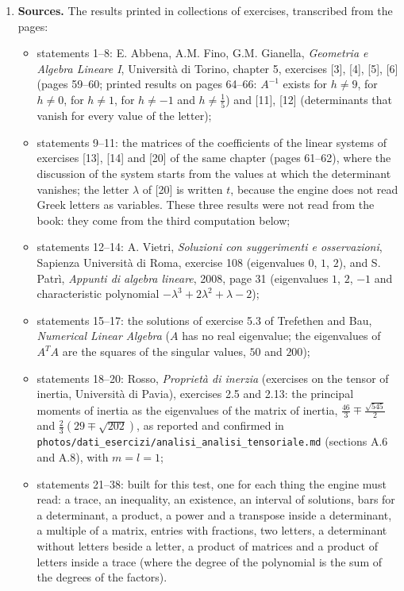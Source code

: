 \documentclass[11pt,a4paper]{article}
\begin{document}
\begin{enumerate}
\item \textbf{Sources.} The results printed in collections of exercises, transcribed from the pages:
\begin{itemize}
\item statements 1--8: E. Abbena, A.M. Fino, G.M. Gianella, \emph{Geometria e Algebra Lineare I}, Universit\`a di Torino, chapter 5, exercises [3], [4], [5], [6] (pages 59--60; printed results on pages 64--66: $A^{-1}$ exists for $h \neq 9$, for $h \neq 0$, for $h \neq 1$, for $h \neq -1$ and $h \neq \frac{1}{5}$) and [11], [12] (determinants that vanish for every value of the letter);
\item statements 9--11: the matrices of the coefficients of the linear systems of exercises [13], [14] and [20] of the same chapter (pages 61--62), where the discussion of the system starts from the values at which the determinant vanishes; the letter $\lambda$ of [20] is written $t$, because the engine does not read Greek letters as variables. These three results were not read from the book: they come from the third computation below;
\item statements 12--14: A. Vietri, \emph{Soluzioni con suggerimenti e osservazioni}, Sapienza Universit\`a di Roma, exercise 108 (eigenvalues $0$, $1$, $2$), and S. Patr\`i, \emph{Appunti di algebra lineare}, 2008, page 31 (eigenvalues $1$, $2$, $-1$ and characteristic polynomial $-\lambda^{3} + 2\lambda^{2} + \lambda - 2$);
\item statements 15--17: the solutions of exercise 5.3 of Trefethen and Bau, \emph{Numerical Linear Algebra} ($A$ has no real eigenvalue; the eigenvalues of $A^{T}A$ are the squares of the singular values, $50$ and $200$);
\item statements 18--20: Rosso, \emph{Propriet\`a di inerzia} (exercises on the tensor of inertia, Universit\`a di Pavia), exercises 2.5 and 2.13: the principal moments of inertia as the eigenvalues of the matrix of inertia, $\frac{46}{3} \mp \frac{\sqrt{545}}{2}$ and $\frac{2}{3}(29 \mp \sqrt{202})$, as reported and confirmed in \texttt{photos/dati\_esercizi/analisi\_analisi\_tensoriale.md} (sections A.6 and A.8), with $m = l = 1$;
\item statements 21--38: built for this test, one for each thing the engine must read: a trace, an inequality, an existence, an interval of solutions, bars for a determinant, a product, a power and a transpose inside a determinant, a multiple of a matrix, entries with fractions, two letters, a determinant without letters beside a letter, a product of matrices and a product of letters inside a trace (where the degree of the polynomial is the sum of the degrees of the factors).
\end{itemize}


\end{enumerate}
\end{document}
